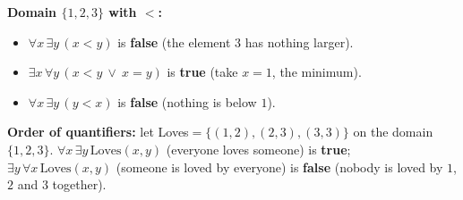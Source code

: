\documentclass[11pt,a4paper]{article}
\begin{document}
\begin{example}
\textbf{Domain $\{1,2,3\}$ with $<$:}
\begin{itemize}[noitemsep]
\item $\forall x\,\exists y\,(x<y)$ is \textbf{false} (the element $3$ has nothing larger).
\item $\exists x\,\forall y\,(x<y\ \vee\ x=y)$ is \textbf{true} (take $x=1$, the minimum).
\item $\forall x\,\exists y\,(y<x)$ is \textbf{false} (nothing is below $1$).
\end{itemize}
\textbf{Order of quantifiers:} let Loves$=\{(1,2),(2,3),(3,3)\}$ on the domain $\{1,2,3\}$. $\forall x\,\exists y\,\text{Loves}(x,y)$ (everyone loves someone) is \textbf{true}; $\exists y\,\forall x\,\text{Loves}(x,y)$ (someone is loved by everyone) is \textbf{false} (nobody is loved by $1$, $2$ and $3$ together).
\end{example}
\end{document}
